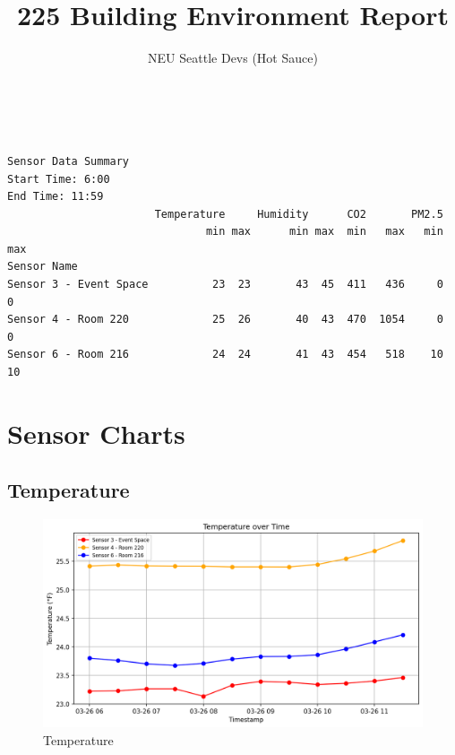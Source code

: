 \documentclass[
  12pt,
  letterpaper,
]{article}
\title{225 Building Environment Report}
\author{NEU Seattle Devs (Hot Sauce)}
\date{}
\renewcommand*\contentsname{Table of contents}
\newcommand\contentsname{Table of contents}
\begin{document}
\maketitle

\renewcommand*\contentsname{Table of contents}
{
\hypersetup{linkcolor=}
\setcounter{tocdepth}{3}
\tableofcontents
}

\begin{verbatim}


Sensor Data Summary
Start Time: 6:00
End Time: 11:59
                       Temperature     Humidity      CO2       PM2.5    
                               min max      min max  min   max   min max
Sensor Name                                                             
Sensor 3 - Event Space          23  23       43  45  411   436     0   0
Sensor 4 - Room 220             25  26       40  43  470  1054     0   0
Sensor 6 - Room 216             24  24       41  43  454   518    10  10
\end{verbatim}

\section{Sensor Charts}\label{sensor-charts}

\subsection{Temperature}\label{temperature}

\begin{figure}[H]

{\centering \includegraphics[width=0.85\linewidth,height=\textheight,keepaspectratio]{./charts/temperature_chart.png}

}

\caption{Temperature}

\end{figure}%
\end{document}
